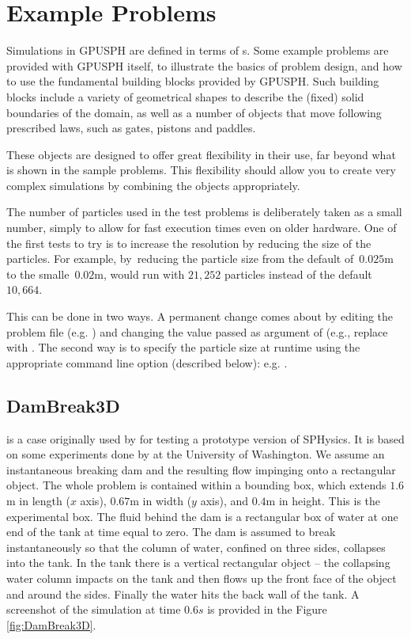 \documentclass{../GPUSPHtemplate}
\begin{document}
\section{Example Problems}

Simulations in GPUSPH are defined in terms of s. Some
example problems are provided with GPUSPH itself, to illustrate the
basics of problem design, and how to use the fundamental building blocks
provided by GPUSPH. Such building blocks include a variety of
geometrical shapes to describe the (fixed) solid boundaries of the
domain, as well as a number of objects that move following prescribed
laws, such as gates, pistons and paddles.

These objects are designed to offer great flexibility in their use, far
beyond what is shown in the sample problems. This flexibility should
allow you to create very complex simulations by combining the objects
appropriately.

The number of particles used in the test problems is deliberately taken
as a small number, simply to allow for fast execution times even on
older hardware. One of the first tests to try is to increase the
resolution by reducing the size of the particles. For example,
by~reducing the particle size from the default of~$0.025$m to the
smalle~$0.02$m,  would run with $21,252$ particles
instead of the default $10,664$.

This can be done in two ways. A permanent change comes about by editing
the problem file (e.g. ) and changing the value
passed as argument of  (e.g., replace
 with . The second way
is to specify the particle size at runtime using the appropriate command
line option (described below): e.g. .

\subsection{DamBreak3D}

 is a case originally used by
\cite{gomez-gesteira_using_2004}
for testing a prototype version of SPHysics. It is based on some
experiments done by \cite{arnason_interactions_2005} at the University of Washington.
We assume an instantaneous breaking dam and the resulting flow impinging
onto a rectangular object. The whole problem is contained within a
bounding box, which extends $1.6$m in length ($x$ axis), $0.67$m in
width ($y$ axis), and $0.4$m in height. This is the experimental box.
The fluid behind the dam is a rectangular box of water at one end of the
tank at time equal to zero. The dam is assumed to break instantaneously
so that the column of water, confined on three sides, collapses into the
tank. In the tank there is a vertical rectangular object -- the
collapsing water column impacts on the tank and then flows up the front
face of the object and around the sides. Finally the water hits the back
wall of the tank. A screenshot of the simulation at time $0.6s$ is provided
in the Figure \ref{fig:DamBreak3D}.
\end{document}
